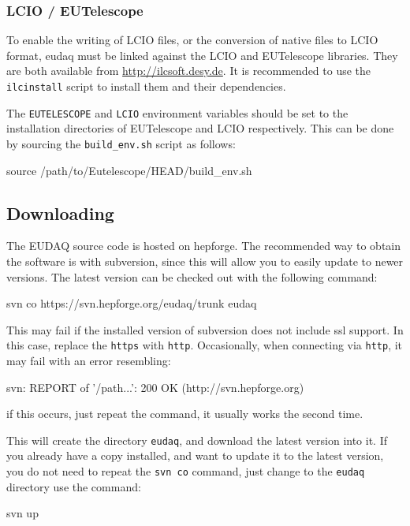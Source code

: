 \subsubsection{LCIO / EUTelescope}\label{sec:LCIO-EUTel}
To enable the writing of \gls{LCIO} files, or the conversion of native files to \gls{LCIO} format,
eudaq must be linked against the \gls{LCIO} and EUTelescope libraries.
They are both available from \url{http://ilcsoft.desy.de}.
It is recommended to use the \texttt{ilcinstall} script to install them and their dependencies.

The \texttt{EUTELESCOPE} and \texttt{LCIO} environment variables should be set to the
installation directories of EUTelescope and LCIO respectively.
This can be done by sourcing the \texttt{build\_env.sh} script as follows:
\begin{listing}[mybash]
source /path/to/Eutelescope/HEAD/build_env.sh
\end{listing}

\subsection{Downloading}
The EUDAQ source code is hosted on hepforge. The recommended way to obtain the software is with subversion,
since this will allow you to easily update to newer versions.
The latest version can be checked out with the following command:
\begin{listing}[mybash]
svn co https://svn.hepforge.org/eudaq/trunk eudaq
\end{listing}

This may fail if the installed version of subversion does not include ssl support. In this case, replace the \texttt{https} with \texttt{http}. Occasionally, when connecting via \texttt{http}, it may fail with an error resembling:
\begin{listing}[]
svn: REPORT of '/path...': 200 OK (http://svn.hepforge.org)
\end{listing}

if this occurs, just repeat the command, it usually works the second time.

This will create the directory \texttt{eudaq}, and download the latest version into it. 
If you already have a copy installed, and want to update it to the latest version, you do not need to repeat the \texttt{svn co} command, just change to the \texttt{eudaq} directory use the command:
\begin{listing}[mybash]
svn up
\end{listing}

